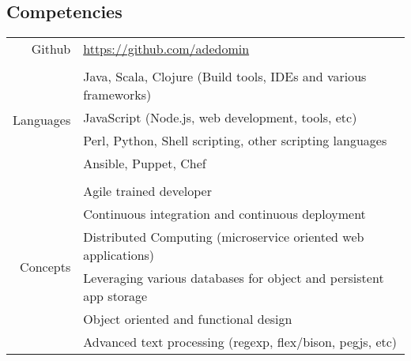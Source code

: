 \documentclass[letterpaper,]{article}
\begin{document}
\subsection{Competencies}\label{competencies}

\begin{center}
\begin{tabular}{r|l}
    Github                     & \href{https://github.com/adedomin}{https://github.com/adedomin} \\
    \\
    \multirow{4}{*}{Languages} & Java, Scala, Clojure (Build tools, IDEs and various frameworks) \\
                               & JavaScript (Node.js, web development, tools, etc) \\
                               & Perl, Python, Shell scripting, other scripting languages \\
                               & Ansible, Puppet, Chef \\
    \\
    \multirow{6}{*}{Concepts} & Agile trained developer \\
                              & Continuous integration and continuous deployment \\
                              & Distributed Computing (microservice oriented web applications) \\
                              & Leveraging various databases for object and persistent app storage \\
                              & Object oriented and functional design \\
                              & Advanced text processing (regexp, flex/bison, pegjs, etc) \\
\end{tabular}
\end{center}
\end{document}
